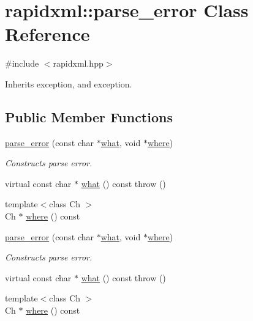 \hypertarget{classrapidxml_1_1parse__error}{}\section{rapidxml\+:\+:parse\+\_\+error Class Reference}
\label{classrapidxml_1_1parse__error}


{\ttfamily \#include $<$rapidxml.\+hpp$>$}



Inherits exception, and exception.

\subsection*{Public Member Functions}
\begin{DoxyCompactItemize}
\item 
\mbox{\hyperlink{classrapidxml_1_1parse__error_aea12a301271c393fb627b368fb9f35c1}{parse\+\_\+error}} (const char $\ast$\mbox{\hyperlink{classrapidxml_1_1parse__error_a986003116ebcb49a69a20228da306232}{what}}, void $\ast$\mbox{\hyperlink{classrapidxml_1_1parse__error_ab139528f4d9e960f0ee807d22d6c032d}{where}})
\begin{DoxyCompactList}\small\item\em Constructs parse error. \end{DoxyCompactList}\item 
virtual const char $\ast$ \mbox{\hyperlink{classrapidxml_1_1parse__error_a986003116ebcb49a69a20228da306232}{what}} () const  throw ()
\item 
{\footnotesize template$<$class Ch $>$ }\\Ch $\ast$ \mbox{\hyperlink{classrapidxml_1_1parse__error_ab139528f4d9e960f0ee807d22d6c032d}{where}} () const
\item 
\mbox{\hyperlink{classrapidxml_1_1parse__error_aea12a301271c393fb627b368fb9f35c1}{parse\+\_\+error}} (const char $\ast$\mbox{\hyperlink{classrapidxml_1_1parse__error_a986003116ebcb49a69a20228da306232}{what}}, void $\ast$\mbox{\hyperlink{classrapidxml_1_1parse__error_ab139528f4d9e960f0ee807d22d6c032d}{where}})
\begin{DoxyCompactList}\small\item\em Constructs parse error. \end{DoxyCompactList}\item 
virtual const char $\ast$ \mbox{\hyperlink{classrapidxml_1_1parse__error_a986003116ebcb49a69a20228da306232}{what}} () const  throw ()
\item 
{\footnotesize template$<$class Ch $>$ }\\Ch $\ast$ \mbox{\hyperlink{classrapidxml_1_1parse__error_ab139528f4d9e960f0ee807d22d6c032d}{where}} () const
\end{DoxyCompactItemize}



